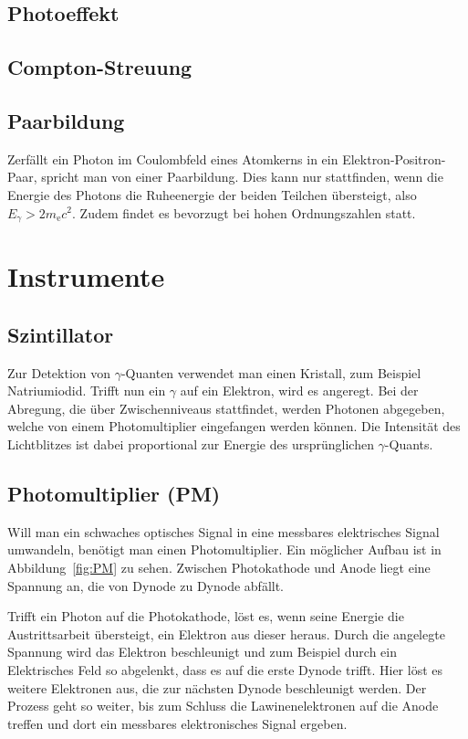 \subsection{Photoeffekt}

\subsection{Compton-Streuung}

\subsection{Paarbildung}

Zerfällt ein Photon im Coulombfeld eines Atomkerns in ein
Elektron-Positron-Paar, spricht man von einer Paarbildung. Dies kann nur
stattfinden, wenn die Energie des Photons die Ruheenergie der beiden Teilchen
übersteigt, also $E_\gamma > 2m_\mathrm{e}c^2$. Zudem findet es bevorzugt bei
hohen Ordnungszahlen statt.

\section{Instrumente}

\subsection{Szintillator}

Zur Detektion von $\gamma$-Quanten verwendet man einen Kristall, zum Beispiel
Natriumiodid. Trifft nun ein $\gamma$ auf ein Elektron, wird es angeregt. Bei
der Abregung, die über Zwischenniveaus stattfindet, werden Photonen abgegeben,
welche von einem Photomultiplier eingefangen werden können. Die Intensität des
Lichtblitzes ist dabei proportional zur Energie des ursprünglichen
$\gamma$-Quants.

\subsection{Photomultiplier (PM)}

Will man ein schwaches optisches Signal in eine messbares elektrisches Signal
umwandeln, benötigt man einen Photomultiplier. Ein möglicher Aufbau ist in
Abbildung~\ref{fig:PM} zu sehen. Zwischen Photokathode und Anode liegt eine
Spannung an, die von Dynode zu Dynode abfällt.

Trifft ein Photon auf die Photokathode, löst es, wenn seine Energie die
Austrittsarbeit übersteigt, ein Elektron aus dieser heraus. Durch die angelegte
Spannung wird das Elektron beschleunigt und zum Beispiel durch ein Elektrisches
Feld so abgelenkt, dass es auf die erste Dynode trifft. Hier löst es weitere
Elektronen aus, die zur nächsten Dynode beschleunigt werden. Der Prozess geht
so weiter, bis zum Schluss die Lawinenelektronen auf die Anode treffen und dort
ein messbares elektronisches Signal ergeben.

